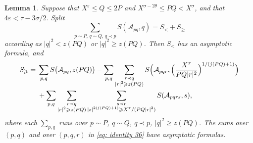 \documentclass{article}
\numberwithin{equation}{section}
\newtheorem{lemma}{Lemma}
\newcommand{\Le}{\leqslant}
\newcommand{\Ge}{\geqslant}
\begin{document}
\begin{lemma}
\label{lem: lemma 14}
Suppose that $X^{\varepsilon} \Le Q \Le 2P$ and $X^{\sigma - 2\theta} \Le PQ < X^{\sigma}$, and that $4\varepsilon < \tau - 3\sigma/2$. Split
\begin{equation}
\label{eq: lemma 14 split}
\sum_{p \sim P,\, q \sim Q,\, q \prec p} S(\mathcal{A}_{pq}, q) = S_< + S_\Ge
\end{equation}
according as $|q|^2 < z(PQ)$ or $|q|^2 \Ge z(PQ)$. Then $S_<$ has an asymptotic formula, and
\begin{equation}
\label{eq: identity 36}
\begin{aligned}
S_\Ge = {} & \sum_{p, q} S\bigl(\mathcal{A}_{pq}, z(PQ)\bigr) - \sum_{p, q} \sum_{\substack{r \prec q \\ |r|^2 \Ge z(PQ)}} S\Bigl(\mathcal{A}_{pqr}, \Bigl(\frac{X^{\tau}}{PQ|r|^2}\Bigr)^{1/(j(PQ)+1)}\Bigr) \\
& + \sum_{p, q} \sum_{\substack{r \prec q \\ |r|^2 \Ge z(PQ)}} \sum_{\substack{s \prec r \\ |s|^{2(j(PQ)+1)} \Ge X^{\tau}/(PQ|r|^2)}} S(\mathcal{A}_{pqrs}, s),
\end{aligned}
\end{equation}
where each $\sum_{p, q}$ runs over $p \sim P$, $q \sim Q$, $q \prec p$, $|q|^2 \Ge z(PQ)$. The sums over $(p, q)$ and over $(p, q, r)$ in \eqref{eq: identity 36} have asymptotic formulas.
\end{lemma}
\end{document}
